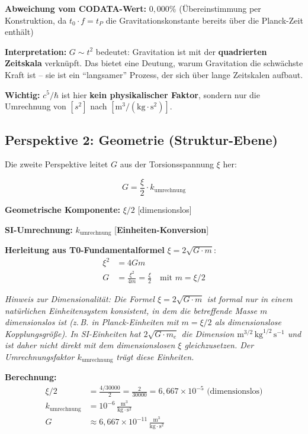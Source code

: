 	\textbf{Abweichung vom CODATA-Wert:} \(0{,}000\%\) (Übereinstimmung per Konstruktion, da \(t_0 \cdot f = t_P\) die Gravitationskonstante bereits über die Planck-Zeit enthält)
	
	\textbf{Interpretation:} \(G \sim t^2\) bedeutet: Gravitation ist mit der \textbf{quadrierten Zeitskala} verknüpft. Das bietet eine Deutung, warum Gravitation die schwächste Kraft ist -- sie ist ein \enquote{langsamer} Prozess, der sich über lange Zeitskalen aufbaut.
	
	\textbf{Wichtig:} \(c^5/\hbar\) ist hier \textbf{kein physikalischer Faktor}, sondern nur die Umrechnung von \([s^2]\) nach \([\text{m}^3/(\text{kg} \cdot \text{s}^2)]\).
	
	\subsection{Perspektive 2: Geometrie (Struktur-Ebene)}
	
	Die zweite Perspektive leitet \(G\) aus der Torsionsspannung \(\xi\) her:
	
	\begin{equation}
		\boxed{G = \frac{\xi}{2} \cdot k_{\text{umrechnung}}}
	\end{equation}
	
	\textbf{Geometrische Komponente:} \(\xi/2\) [dimensionslos]
	
	\textbf{SI-Umrechnung:} \(k_{\text{umrechnung}}\) [\textbf{Einheiten-Konversion}]
	
	\textbf{Herleitung aus T0-Fundamentalformel} \(\xi = 2\sqrt{G \cdot m}\):
	\begin{align}
		\xi^2 &= 4Gm \\
		G &= \frac{\xi^2}{4m} = \frac{\xi}{2} \quad \text{mit } m = \xi/2
	\end{align}
	
	\textit{Hinweis zur Dimensionalität: Die Formel $\xi = 2\sqrt{G \cdot m}$ ist formal nur in einem natürlichen Einheitensystem konsistent, in dem die betreffende Masse $m$ dimensionslos ist (z.\,B. in Planck-Einheiten mit $m = \xi/2$ als dimensionslose Kopplungsgröße). In SI-Einheiten hat $2\sqrt{G \cdot m_e}$ die Dimension $\text{m}^{3/2}\,\text{kg}^{1/2}\,\text{s}^{-1}$ und ist daher nicht direkt mit dem dimensionslosen $\xi$ gleichzusetzen. Der Umrechnungsfaktor $k_{\text{umrechnung}}$ trägt diese Einheiten.}
	
	\textbf{Berechnung:}
	\begin{align}
		\xi/2 &= \frac{4/30000}{2} = \frac{2}{30000} = 6{,}667 \times 10^{-5} \text{ (dimensionslos)} \\
		k_{\text{umrechnung}} &= 10^{-6}\,\frac{\text{m}^3}{\text{kg} \cdot \text{s}^2} \\
		G &\approx 6{,}667 \times 10^{-11}\,\frac{\text{m}^3}{\text{kg} \cdot \text{s}^2}
	\end{align}
	
